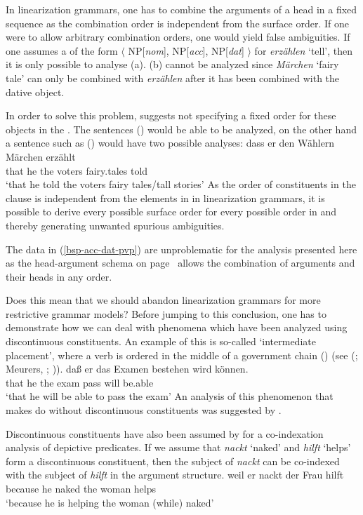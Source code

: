 In linearization grammars, one has to combine the arguments of a head in a fixed sequence as the combination
order is independent from the surface order. If one were to allow arbitrary combination orders, one would yield
false ambiguities. If one assumes a \subcatl of the form $\langle$ NP[{\it nom}], NP[{\it acc}],
NP[{\it dat}] $\rangle$ for \emph{erzählen} `tell', then it is only possible to analyse (a).
(b) cannot be analyzed since \emph{Märchen} `fairy tale' can only be combined with \emph{erzählen} after it has 
been combined with the dative object. 


In order to solve this problem, \citet[]{Kathol2000a} suggests not specifying a 
fixed order for these objects in the \subcatl. The sentences () would be able to
be analyzed, on the other hand a sentence such as () would have two possible analyses:
\ea
\gll dass er den Wählern Märchen erzählt\\
	 that he the voters fairy.tales told\\
\glt `that he told the voters fairy tales/tall stories'
\z
As the order of constituents in the clause is independent from the elements in \subcatl in linearization
grammars, it is possible to derive every possible surface order for every possible order in \subcatl
and thereby generating unwanted spurious ambiguities.

The data in (\ref{bsp-acc-dat-pvp}) are unproblematic for the analysis presented here as the head-argument schema
on page \,\pageref{schema-bin} allows the combination of arguments and their heads in any order.

Does this mean that we should abandon linearization grammars for more restrictive grammar models? Before jumping to
this conclusion, one has to demonstrate how we can deal with phenomena which have been analyzed using discontinuous
constituents. An example of this is so-called `intermediate placement', where a verb is ordered in the middle of a
government chain () (see (\citealp[]{dBE83a};
Meurers, \citeyear[Chapter~3.2.2]{Meurers97a}; \citeyear[Chapter~3.2.1.3]{Meurers2000b})).
\ea
\gll daß er das Examen bestehen wird können.\\
     that he the exam pass  will be.able\\
\glt `that he will be able to pass the exam'
\z
An analysis of this phenomenon that makes do without discontinuous constituents was suggested by \citet{Meurers2000b}.

Discontinuous constituents have also been assumed by  for a co-indexation analysis of
depictive predicates. If we assume that \emph{nackt} `naked' and \emph{hilft} `helps' form a discontinuous
constituent, then the subject of \emph{nackt} can be co-indexed with the subject of \emph{hilft} in the argument
structure.
\ea
\gll weil er nackt der Frau hilft\\
	 because he naked the woman helps\\
\glt `because he is helping the woman (while) naked'
\z



